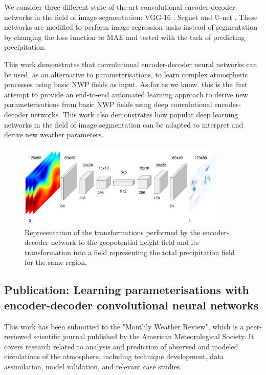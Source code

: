 We consider three different state-of-the-art convolutional encoder-decoder networks in the field of image segmentation: VGG-16 \citep{long2015fully}, Segnet \citep{badrinarayanan2017segnet} and U-net \citep{ronneberger2015u}. These networks are modified to perform image regression tasks instead of segmentation by changing the loss function to MAE and tested with the task of predicting precipitation.

This work demonstrates that convolutional encoder-decoder neural networks can be used, as an alternative to parameterisations, to learn complex atmospheric processes using basic NWP fields as input. As far as we know, this is the first attempt to provide an end-to-end automated learning approach to derive new parameterisations from basic NWP fields using deep convolutional encoder-decoder networks. This work also demonstrates how popular deep learning networks in the field of image segmentation can be adapted to interpret and derive new weather parameters.

\begin{figure}[h]
 \centerline{\includegraphics[width=10cm]{paper4.png}}\caption{Representation of the transformations performed by the encoder-decoder network to the geopotential height field and its transformation into a field representing the total precipitation field for the same region.}\label{paper4}
\end{figure}

\subsection{Publication: Learning parameterisations with encoder-decoder convolutional neural networks}

This work has been submitted to the "Monthly Weather Review", which is a peer-reviewed scientific journal published by the American Meteorological Society. It covers research related to analysis and prediction of observed and modeled circulations of the atmosphere, including technique development, data assimilation, model validation, and relevant case studies.

